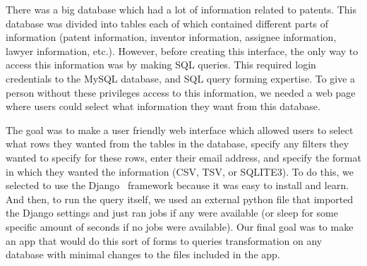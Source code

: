 There was a big database which had a lot of information related to patents. This database was divided into tables each of which contained different parts of information (patent information, inventor information, assignee information, lawyer information, etc.). However, before creating this interface, the only way to access this information was by making SQL queries. This required login credentials to the MySQL database, and SQL query forming expertise. To give a person without these privileges access to this information, we needed a web page where users could select what information they want from this database.

	The goal was to make a user friendly web interface which allowed users to select what rows they wanted from the tables in the database, specify any filters they wanted to specify for these rows, enter their email address, and specify the format in which they wanted the information (CSV, TSV, or SQLITE3). To do this, we selected to use the Django~\cite{django} framework because it was easy to install and learn. And then, to run the query itself, we used an external python file that imported the Django settings and just ran jobs if any were available (or sleep for some specific amount of seconds if no jobs were available). Our final goal was to make an app that would do this sort of forms to queries transformation on any database with minimal changes to the files included in the app. 
